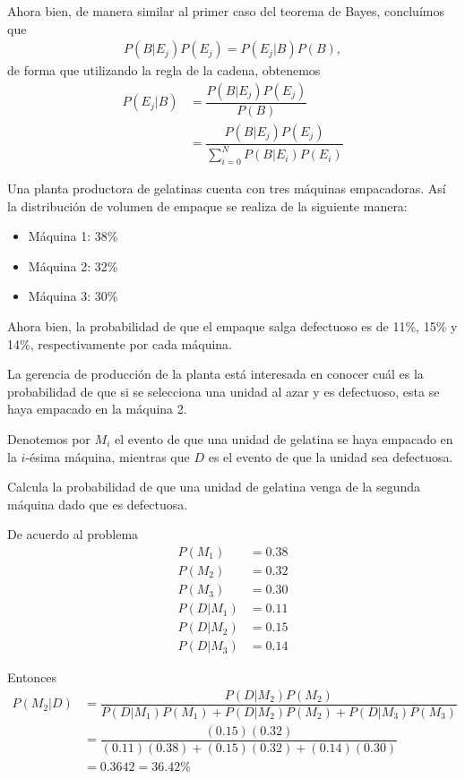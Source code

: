 Ahora bien, de manera similar al primer caso del teorema de Bayes, concluímos que 
\begin{align}
	P(B|E_j)P(E_j)= P(E_j|B)P(B),
\end{align}
de forma que utilizando la regla de la cadena, obtenemos
\begin{align}
	P(E_j|B)&= \dfrac{P(B|E_j)P(E_j)}{P(B)}\\
	&=\dfrac{P(B|E_j)P(E_j)}{\sum_{i=0}^{N} P(B|E_i)P(E_i)}
\end{align}

\begin{ejemplo}
	Una planta productora de gelatinas cuenta con tres máquinas empacadoras. Así la distribución de volumen de empaque se realiza de la siguiente manera:
	\begin{itemize}
		\item Máquina 1: 38\%
		\item Máquina 2: 32\%
		\item Máquina 3: 30\%
	\end{itemize}
	
	Ahora bien, la probabilidad de que el empaque salga defectuoso es de 11\%, 15\% y 14\%, respectivamente por cada máquina. 
	
	La gerencia de producción de la planta está interesada en conocer cuál es la probabilidad de que si se selecciona una unidad al azar y es defectuoso, esta se haya empacado en la máquina 2. 

	Denotemos por $ M_i $ el evento de que una unidad de gelatina se haya empacado en la $ i $-ésima máquina, mientras que $ D $ es el evento de que la unidad sea defectuosa. 
	
	Calcula la probabilidad de que una unidad de gelatina venga de la segunda máquina dado que es defectuosa. 
\end{ejemplo}
	
\begin{solucion}
	
	De acuerdo al problema 
	\begin{align}
		P(M_1)&=0.38\\
		P(M_2)&=0.32\\
		P(M_3)&=0.30\\
		P(D|M_1)&=0.11\\
		P(D|M_2)&=0.15\\
		P(D|M_3)&=0.14
	\end{align}
	
	Entonces 
	\begin{align}
		P(M_2|D) &= \dfrac{P(D|M_2)P(M_2)}{	P(D|M_1)P(M_1)+P(D|M_2)P(M_2)+P(D|M_3)P(M_3)
		}\\
		&= \dfrac{(0.15)(0.32)}{
			(0.11)(0.38)+(0.15)(0.32)+(0.14)(0.30)	
		}\\
		&=0.3642=36.42\%
	\end{align}
\end{solucion}